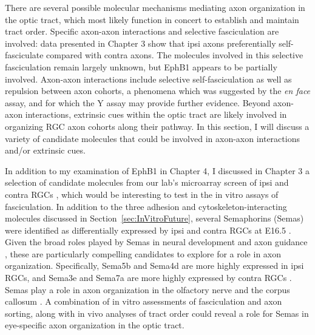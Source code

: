 There are several possible molecular mechanisms mediating axon organization in the optic tract, which most likely function in concert to establish and maintain tract order.
Specific axon-axon interactions and selective fasciculation are involved: data presented in Chapter 3 show that ipsi axons preferentially self-fasciculate compared with contra axons.
The molecules involved in this selective fasciculation remain largely unknown, but EphB1 appears to be partially involved.
Axon-axon interactions include selective self-fasciculation as well as repulsion between axon cohorts, a phenomena which was suggested by the \emph{en face} assay, and for which the Y assay may provide further evidence.
Beyond axon-axon interactions, extrinsic cues within the optic tract are likely involved in organizing RGC axon cohorts along their pathway.
In this section, I will discuss a variety of candidate molecules that could be involved in axon-axon interactions and/or extrinsic cues.

In addition to my examination of EphB1 in Chapter 4, I discussed in Chapter 3 a selection of candidate molecules from our lab's microarray screen of ipsi and contra RGCs \cite{wang2016ipsilateral}, which would be interesting to test in the in vitro assays of fasciculation.
In addition to the three adhesion and cytoskeleton-interacting molecules discussed in Section~\ref{sec:InVitroFuture}, several Semaphorins (Semas) were identified as differentially expressed by ipsi and contra RGCs at E16.5 \cite{wang2016ipsilateral}.
Given the broad roles played by Semas in neural development and axon guidance \cite{raper2000semaphorins}, these are particularly compelling candidates to explore for a role in axon organization.
Specifically, Sema5b and Sema4d are more highly expressed in ipsi RGCs, and Sema3e and Sema7a are more highly expressed by contra RGCs \cite{wang2016ipsilateral}.
Semas play a role in axon organization in the olfactory nerve \cite{imai2009pre} and the corpus callosum \cite{zhou2013axon}.
A combination of in vitro assessments of fasciculation and axon sorting, along with in vivo analyses of tract order could reveal a role for Semas in eye-specific axon organization in the optic tract.


